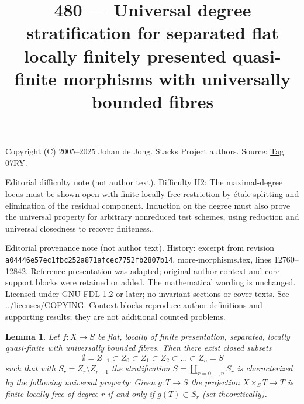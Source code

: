 \documentclass{amsart}
\theoremstyle{plain}
\newtheorem{lemma}[subsection]{Lemma}
\theoremstyle{definition}
\theoremstyle{remark}
\numberwithin{equation}{subsection}
\begin{document}
\title[Stacks Project, Tag 07RY]{480 --- Universal degree stratification for separated flat locally finitely presented quasi-finite morphisms with universally bounded fibres}
\maketitle
\noindent Copyright (C) 2005--2025 Johan de Jong. Stacks Project authors. Source: \href{https://stacks.math.columbia.edu/tag/07RY}{Tag 07RY}.

\noindent Editorial difficulty note (not author text). Difficulty H2: The maximal-degree locus must be shown open with finite locally free restriction by étale splitting and elimination of the residual component. Induction on the degree must also prove the universal property for arbitrary nonreduced test schemes, using reduction and universal closedness to recover finiteness..

\noindent Editorial provenance note (not author text). History: excerpt from revision \texttt{a0444\allowbreak 6e57e\allowbreak c1fbc\allowbreak 252a8\allowbreak 71afc\allowbreak ec775\allowbreak 2fb28\allowbreak 07b14}, more-morphisms.tex, lines 12760--12842. Reference presentation was adapted; original-author context and core support blocks were retained or added. The mathematical wording is unchanged. Licensed under GNU FDL 1.2 or later; no invariant sections or cover texts. See ../licenses/COPYING. Context blocks reproduce author definitions and supporting results; they are not additional counted problems.

\begin{lemma}
\label{lemma-stratify-flat-fp-lqf-universally-bounded}
Let $f : X \to S$ be flat, locally of finite presentation, separated,
locally quasi-finite with universally bounded fibres. Then there exist
closed subsets
$$
\emptyset = Z_{-1} \subset Z_0 \subset Z_1 \subset Z_2 \subset
\ldots \subset Z_n = S
$$
such that with $S_r = Z_r \setminus Z_{r - 1}$ the stratification
$S = \coprod_{r = 0, \ldots, n} S_r$ is characterized by the following
universal property: Given $g : T \to S$ the projection
$X \times_S T \to T$ is finite locally
free of degree $r$ if and only if $g(T) \subset S_r$ (set theoretically).
\end{lemma}
\end{document}
